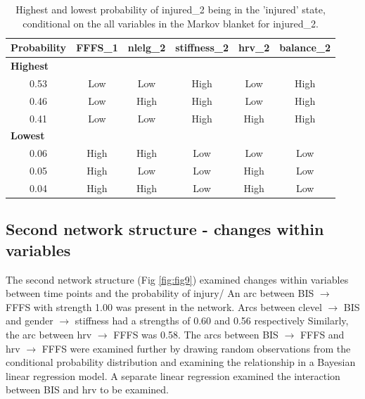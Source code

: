 \documentclass[
  english,
  man]{apa6}
\begin{document}
\begin{table}[H]

\caption{\label{tab:table8}Highest and lowest probability of injured\_2 being in the 'injured' state, conditional on the all variables in the Markov blanket for injured\_2.}
\centering
\begin{tabular}[t]{c|c|c|c|c|c}
\hline
\textbf{Probability} & \textbf{FFFS\_1} & \textbf{nlelg\_2} & \textbf{stiffness\_2} & \textbf{hrv\_2} & \textbf{balance\_2}\\
\hline
\multicolumn{6}{l}{\textbf{Highest}}\\
\hline
\hspace{1em}0.53 & Low & Low & High & Low & High\\
\hline
\hspace{1em}0.46 & Low & High & High & Low & High\\
\hline
\hspace{1em}0.41 & Low & Low & High & High & High\\
\hline
\multicolumn{6}{l}{\textbf{Lowest}}\\
\hline
\hspace{1em}0.06 & High & High & Low & Low & Low\\
\hline
\hspace{1em}0.05 & High & Low & Low & High & Low\\
\hline
\hspace{1em}0.04 & High & High & Low & High & Low\\
\hline
\end{tabular}
\end{table}

\hypertarget{second-network-structure---changes-within-variables}{%
\subsection{Second network structure - changes within variables}\label{second-network-structure---changes-within-variables}}

The second network structure (Fig \ref{fig:fig9}) examined changes within variables between time points and the probability of injury/
An arc between BIS \(\rightarrow\) FFFS with strength 1.00 was present in the network.
Arcs between clevel \(\rightarrow\) BIS and gender \(\rightarrow\) stiffness had a strengths of 0.60 and 0.56 respectively
Similarly, the arc between hrv \(\rightarrow\) FFFS was 0.58.
The arcs between BIS \(\rightarrow\) FFFS and hrv \(\rightarrow\) FFFS were examined further by drawing random observations from the conditional probability distribution and examining the relationship in a Bayesian linear regression model.
A separate linear regression examined the interaction between BIS and hrv to be examined.
\end{document}
